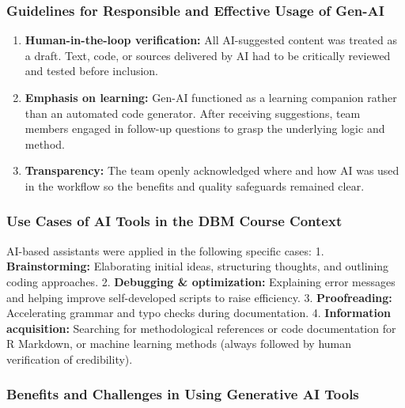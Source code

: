 \documentclass[
]{article}
\providecommand{\tightlist}{%
  \setlength{\itemsep}{0pt}\setlength{\parskip}{0pt}}
\begin{document}
\subsubsection{Guidelines for Responsible and Effective Usage of
Gen-AI}\label{guidelines-for-responsible-and-effective-usage-of-gen-ai}

\begin{enumerate}
\def\labelenumi{\arabic{enumi}.}
\tightlist
\item
  \textbf{Human-in-the-loop verification:} All AI-suggested content was
  treated as a draft. Text, code, or sources delivered by AI had to be
  critically reviewed and tested before inclusion.
\item
  \textbf{Emphasis on learning:} Gen-AI functioned as a learning
  companion rather than an automated code generator. After receiving
  suggestions, team members engaged in follow-up questions to grasp the
  underlying logic and method.
\item
  \textbf{Transparency:} The team openly acknowledged where and how AI
  was used in the workflow so the benefits and quality safeguards
  remained clear.
\end{enumerate}

\subsubsection{Use Cases of AI Tools in the DBM Course
Context}\label{use-cases-of-ai-tools-in-the-dbm-course-context}

AI-based assistants were applied in the following specific cases: 1.
\textbf{Brainstorming:} Elaborating initial ideas, structuring thoughts,
and outlining coding approaches. 2. \textbf{Debugging \& optimization:}
Explaining error messages and helping improve self-developed scripts to
raise efficiency. 3. \textbf{Proofreading:} Accelerating grammar and
typo checks during documentation. 4. \textbf{Information acquisition:}
Searching for methodological references or code documentation for R
Markdown, or machine learning methods (always followed by human
verification of credibility).

\subsubsection{Benefits and Challenges in Using Generative AI
Tools}\label{benefits-and-challenges-in-using-generative-ai-tools}
\end{document}
